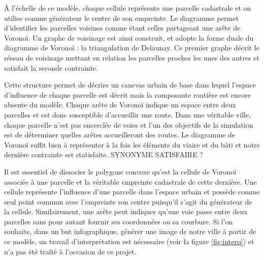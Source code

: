 \documentclass[12pt]{article}
\begin{document}
À l'échelle de ce modèle, chaque cellule représente une parcelle
cadastrale et on utilise comme générateur le centre de son
empreinte. Le diagramme permet d'identifier les parcelles voisines
comme étant celles partageant une arête de Voronoï. Un graphe de
voisinage est ainsi construit, et adopte la forme duale du diagramme
de Voronoï : la triangulation de Delaunay. Ce premier graphe décrit le
réseau de voisinage mettant en relation les parcelles proches les unes
des autres et satisfait la seconde contrainte.

Cette structure permet de décrire un canevas urbain de base dans
lequel l'espace d'influence de chaque parcelle est décrit mais la
composante routière est encore absente du modèle. Chaque arête de
Voronoï indique un espace entre deux parcelles et est donc susceptible
d'accueillir une route. Dans une véritable ville, chaque parcelle
n'est pas encerclée de voies et l'un des objectifs de la simulation
est de déterminer quelles arêtes accueilleront des routes. Le
diagramme de Voronoï suffit bien à représenter à la fois les éléments
du viaire et du bâti et notre dernière contrainte est
statisfaite. SYNONYME SATISFAIRE ?

Il est essentiel de dissocier le polygone convexe qu'est la cellule de
Voronoï associée à une parcelle et la véritable empreinte cadastrale
de cette dernière. Une cellule représente l'influence d'une parcelle
dans l'espace urbain et possède comme seul point commun avec
l'empreinte son centre puisqu'il s'agit du générateur de la
cellule. Similairement, une arête peut indiquer qu'une voie passe
entre deux parcelles sans pour autant fournir ses coordonnées ou sa
courbure. Si l'on souhaite, dans un but infographique, générer une
image de notre ville à partir de ce modèle, un travail
d'interprétation est nécessaire (voir la figure \ref{fig:interp}) et
n'a pas été traîté à l'occasion de ce projet.
\end{document}
